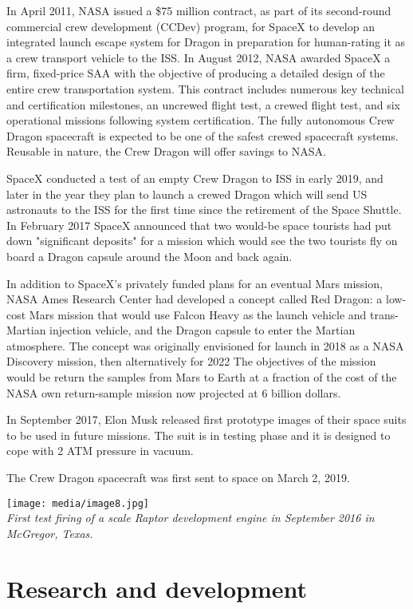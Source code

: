 In April 2011, NASA issued a \$75 million contract, as part of its
second-round commercial crew development (CCDev) program, for SpaceX to
develop an integrated launch escape system for Dragon in preparation for
human-rating it as a crew transport vehicle to the ISS. In August 2012,
NASA awarded SpaceX a firm, fixed-price SAA with the objective of
producing a detailed design of the entire crew transportation system.
This contract includes numerous key technical and certification
milestones, an uncrewed flight test, a crewed flight test, and six
operational missions following system certification. The fully
autonomous Crew Dragon spacecraft is expected to be one of the safest
crewed spacecraft systems. Reusable in nature, the Crew Dragon will
offer savings to NASA.

SpaceX conducted a test of an empty Crew Dragon to ISS in early 2019,
and later in the year they plan to launch a crewed Dragon which will
send US astronauts to the ISS for the first time since the retirement of
the Space Shuttle. In February 2017 SpaceX announced that two would-be
space tourists had put down "significant deposits" for a mission which
would see the two tourists fly on board a Dragon capsule around the Moon
and back again.

In addition to SpaceX's privately funded plans for an eventual Mars
mission, NASA Ames Research Center had developed a concept called Red
Dragon: a low-cost Mars mission that would use Falcon Heavy as the
launch vehicle and trans-Martian injection vehicle, and the Dragon
capsule to enter the Martian atmosphere. The concept was originally
envisioned for launch in 2018 as a NASA Discovery mission, then
alternatively for 2022 The objectives of the mission would be return the
samples from Mars to Earth at a fraction of the cost of the NASA own
return-sample mission now projected at 6 billion dollars.

In September 2017, Elon Musk released first prototype images of their
space suits to be used in future missions. The suit is in testing phase
and it is designed to cope with 2 ATM pressure in vacuum.

The Crew Dragon spacecraft was first sent to space on March 2, 2019.

\texttt{[image: media/image8.jpg]}\\
\emph{First test firing of a scale Raptor development engine in
September 2016 in McGregor, Texas.}

\section{Research and development}\label{research-and-development}


